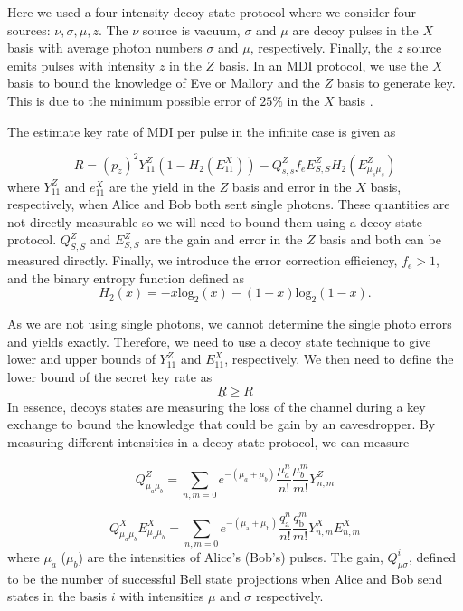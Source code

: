 Here we used a four intensity decoy state protocol where we consider four sources: $\nu, \sigma, \mu, z$. The $\nu$ source is vacuum, $\sigma$ and $\mu$ are decoy pulses in the $X$ basis with average photon numbers $\sigma$ and $\mu$, respectively. Finally, the $z$ source emits pulses with intensity $z$ in the $Z$ basis. In an \ac{MDI} protocol, we use the $X$ basis to bound the knowledge of Eve or Mallory and the $Z$ basis to generate key. This is due to the minimum possible error of $25\%$ in the $X$ basis \cite{Rubenok2013}.

The estimate key rate of \ac{MDI} per pulse in the infinite case is given as

\begin{equation}
	R = (p_z)^2 Y_{11}^Z \left(1 - H_2(E_{11}^X)\right) - Q_{s,s}^Z f_e E_{S,S}^Z H_2(E_{\mu_s\mu_s}^Z)
\end{equation}
where $Y_{11}^Z$ and $e_{11}^X$ are the yield in the $Z$ basis and error in the $X$ basis, respectively, when Alice and Bob both sent single photons. These quantities are not directly measurable so we will need to bound them using a decoy state protocol. $Q_{S,S}^Z$ and $E_{S,S}^Z$ are the gain and error in the $Z$ basis and both can be measured directly. Finally, we introduce the error correction efficiency, $f_e>1$, and the binary entropy function defined as
\begin{equation}
	H_2(x) = -x\mathrm{log}_2(x) - (1-x)\mathrm{log}_2(1-x).
\end{equation}

As we are not using single photons, we cannot determine the single photo errors and yields exactly. Therefore, we need to use a decoy state technique \cite{Lo2005} to give lower and upper bounds of $Y_{11}^Z$ and $E_{11}^X$, respectively. We then need to define the lower bound of the secret key rate as
\begin{equation}
	\underline{R} \geq R
\end{equation}
In essence, decoys states are measuring the loss of the channel during a key exchange to bound the knowledge that could be gain by an eavesdropper.  By measuring different intensities in a decoy state protocol, we can measure

\begin{equation}
	Q_{\mu_a \mu_b}^Z = \sum_{n,m=0} e^{-(\mu_a + \mu_b)}\frac{\mu_a^n}{n!}\frac{\mu_b^m}{m!} Y_{n,m}^Z
\end{equation}

\begin{equation}
	Q_{\mu_{a} \mu_{b}}^X E^{X}_{\mu_{a} \mu_{b}}=\sum_{n, m=0} e^{-\left(\mu_{\mathrm{a}}+\mu_{\mathrm{b}}\right)} \frac{q_{\mathrm{a}}^{n}}{n !} \frac{q_{\mathrm{b}}^{m}}{m !} Y^{X}_{n, m} E^{X}_{n, m}
\end{equation}
where $\mu_a$ ($\mu_b$) are the intensities of Alice's (Bob's) pulses. The gain, $Q_{\mu\sigma}^i$, defined to be the number of successful Bell state projections when Alice and Bob send states in the basis $i$ with intensities $\mu$ and $\sigma$ respectively.

